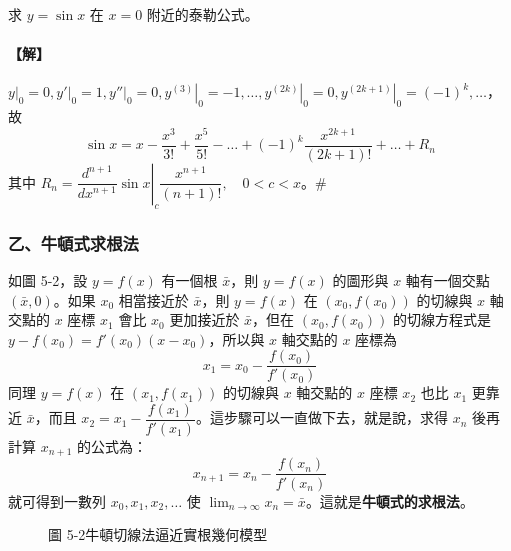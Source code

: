 \setcounter{example}{23}
\begin{example}\label{ex:b6-app4-24}
求 $y=\sin x$ 在 $x=0$ 附近的泰勒公式。
\end{example}

\paragraph{【解】}
$\left.y\right|_0 = 0, \left.y'\right|_0 = 1, \left.y''\right|_0 = 0, \left.y^{(3)}\right|_0 = -1, \dots, \left.y^{(2k)}\right|_0 = 0, \left.y^{(2k+1)}\right|_0 = (-1)^k, \dots$，故
\[ \sin x = x - \dfrac{x^3}{3!} + \dfrac{x^5}{5!} - \dots + (-1)^k\dfrac{x^{2k+1}}{(2k+1)!} + \dots + R_n \]
其中 $R_n = \left.\dfrac{d^{n+1}}{dx^{n+1}}\sin x\right|_c \dfrac{x^{n+1}}{(n+1)!}, \quad 0<c<x$。\hfill$\#$

\subsubsection*{乙、牛頓式求根法}

如圖 5-2，設 $y=f(x)$ 有一個根 $\bar{x}$，則 $y=f(x)$ 的圖形與 $x$ 軸有一個交點 $(\bar{x}, 0)$。如果 $x_0$ 相當接近於 $\bar{x}$，則 $y=f(x)$ 在 $(x_0, f(x_0))$ 的切線與 $x$ 軸交點的 $x$ 座標 $x_1$ 會比 $x_0$ 更加接近於 $\bar{x}$，但在 $(x_0, f(x_0))$ 的切線方程式是 $y-f(x_0) = f'(x_0)(x-x_0)$，所以與 $x$ 軸交點的 $x$ 座標為
\[ x_1 = x_0 - \dfrac{f(x_0)}{f'(x_0)} \]
同理 $y=f(x)$ 在 $(x_1, f(x_1))$ 的切線與 $x$ 軸交點的 $x$ 座標 $x_2$ 也比 $x_1$ 更靠近 $\bar{x}$，而且 $x_2 = x_1 - \dfrac{f(x_1)}{f'(x_1)}$。這步驟可以一直做下去，就是說，求得 $x_n$ 後再計算 $x_{n+1}$ 的公式為：
\begin{equation}
x_{n+1} = x_n - \dfrac{f(x_n)}{f'(x_n)} \label{eq:b6-app4-newton}
\end{equation}
就可得到一數列 $x_0, x_1, x_2, \dots$ 使 $\lim_{n\to\infty} x_n = \bar{x}$。這就是\textbf{牛頓式的求根法}。

\begin{figure}[H]
\centering
{}
\caption{圖 5-2\quad 牛頓切線法逼近實根幾何模型}
\label{fig:b6-app4-newton-geom}
\end{figure}

